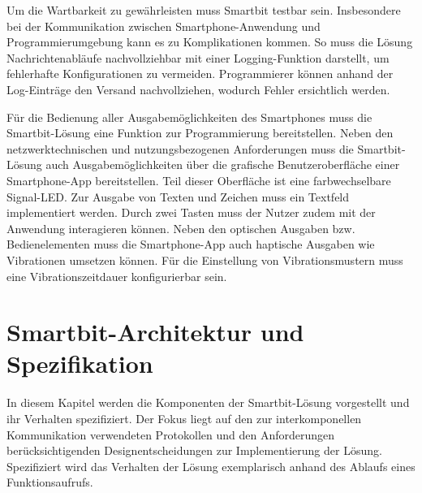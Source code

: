 \documentclass[11pt,a4paper]{report}
\begin{document}
Um die Wartbarkeit zu gewährleisten muss Smartbit testbar sein.
Insbesondere bei der Kommunikation zwischen Smartphone-Anwendung und Programmierumgebung kann es zu Komplikationen kommen.
So muss die Lösung Nachrichtenabläufe nachvollziehbar mit einer Logging-Funktion darstellt, um fehlerhafte Konfigurationen zu vermeiden.
Programmierer können anhand der Log-Einträge den Versand nachvollziehen, wodurch Fehler ersichtlich werden.

Für die Bedienung aller Ausgabemöglichkeiten des Smartphones muss die Smartbit-Lösung eine Funktion zur Programmierung bereitstellen.
Neben den netzwerktechnischen und nutzungsbezogenen Anforderungen muss die Smartbit-Lösung auch Ausgabemöglichkeiten über die grafische Benutzeroberfläche einer Smartphone-App bereitstellen.
Teil dieser Oberfläche ist eine farbwechselbare Signal-LED.
Zur Ausgabe von Texten und Zeichen muss ein Textfeld implementiert werden.
Durch zwei Tasten muss der Nutzer zudem mit der Anwendung interagieren können.
Neben den optischen Ausgaben bzw. Bedienelementen muss die Smartphone-App auch haptische Ausgaben wie Vibrationen umsetzen können.
Für die Einstellung von Vibrationsmustern muss eine Vibrationszeitdauer konfigurierbar sein.

\chapter{Smartbit-Architektur und Spezifikation} \label{chap:architektur}
In diesem Kapitel werden die Komponenten der Smartbit-Lösung vorgestellt und ihr Verhalten spezifiziert.
Der Fokus liegt auf den zur interkomponellen Kommunikation verwendeten Protokollen und den Anforderungen berücksichtigenden Designentscheidungen zur Implementierung der Lösung.
Spezifiziert wird das Verhalten der Lösung exemplarisch anhand des Ablaufs eines Funktionsaufrufs.
\end{document}
